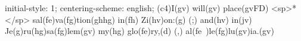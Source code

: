 initial-style: 1;
centering-scheme: english;
(c4)I(gv) will(gv) place(gvFD) <sp>*</sp> sal(fe)va(fg)tion(ghhg) in(fh) Zi(hv)on:(g) (;) and(hv) in(jv) Je(g)ru(hg)sa(fg)lem(gv) my(hg) glo(fe)ry,(d) (,) al(fe~)le(fg)lu(gv)ia.(gv)
